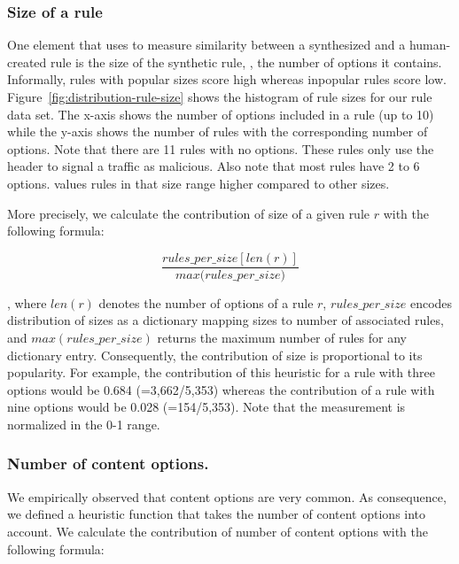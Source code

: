 \documentclass[sigconf,review, anonymous]{acmart}
\begin{document}
\subsubsection{Size of a rule}
One element that \tname{} uses to measure similarity between a
synthesized and a human-created rule is the size of the synthetic
rule, \ie{}, the number of options it contains. Informally, rules with
popular sizes score high whereas inpopular rules score
low. Figure~\ref{fig:distribution-rule-size} shows the histogram of
rule sizes for our rule data set. The x-axis shows the number of
options included in a rule (up to 10) while the y-axis shows the
number of rules with the corresponding number of options. Note that
there are 11 rules with no options. These rules only use the header to
signal a traffic as malicious. Also note that most rules have 2 to 6
options. \tname{} values rules in that size range higher compared to
other sizes.






More precisely, we calculate the contribution of size of a given rule
$r$ with the following formula:

\[\frac{\mathit{rules\_per\_size}[\mathit{len(r)}]}{\mathit{max(rules\_per\_size})}\]

\noindent
, where $\mathit{len(r)}$ denotes the number of options of a rule $r$,
$\mathit{rules\_per\_size}$ encodes distribution of sizes as a
dictionary mapping sizes to number of associated rules, and
$\mathit{max(rules\_per\_size)}$ returns the maximum number of rules
for any dictionary entry. Consequently, the contribution of size is
proportional to its popularity. For example, the contribution of this
heuristic for a rule with three options would be 0.684 (=3,662/5,353)
whereas the contribution of a rule with nine options would be 0.028
(=154/5,353). Note that the measurement is normalized in the 0-1
range.

\subsubsection{Number of content options.} We empirically observed that content options are very
common.   As consequence, we defined a
heuristic function that takes the number of content options into
account. We calculate the contribution of number of content options
with the following formula:
\end{document}
